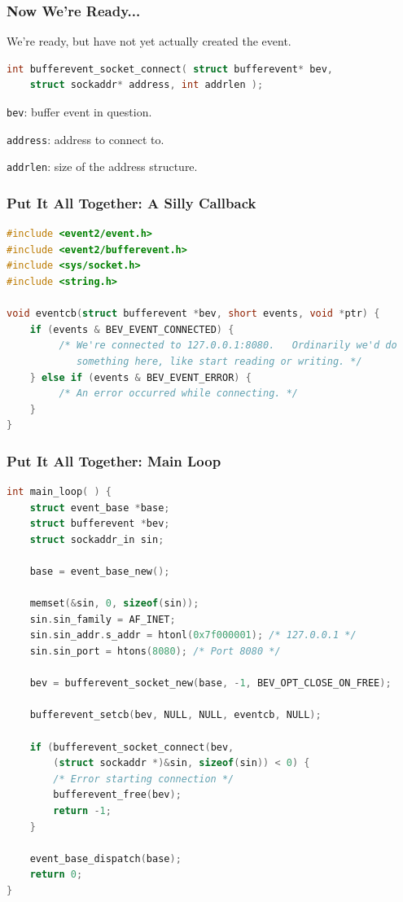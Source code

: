 \begin{frame}[fragile]
	\frametitle{Now We're Ready...}

	We're ready, but have not yet actually created the event.

	\begin{lstlisting}[language=C]
int bufferevent_socket_connect( struct bufferevent* bev, 
    struct sockaddr* address, int addrlen );
\end{lstlisting}

	\texttt{bev}: buffer event in question.

	\texttt{address}: address to connect to.

	\texttt{addrlen}: size of the address structure.

\end{frame}


\begin{frame}[fragile]
	\frametitle{Put It All Together: A Silly Callback}


	\begin{lstlisting}[language=C]
#include <event2/event.h>
#include <event2/bufferevent.h>
#include <sys/socket.h>
#include <string.h>

void eventcb(struct bufferevent *bev, short events, void *ptr) {
    if (events & BEV_EVENT_CONNECTED) {
         /* We're connected to 127.0.0.1:8080.   Ordinarily we'd do
            something here, like start reading or writing. */
    } else if (events & BEV_EVENT_ERROR) {
         /* An error occurred while connecting. */
    }
}
\end{lstlisting}

\end{frame}

\begin{frame}[fragile]
	\frametitle{Put It All Together: Main Loop}

	\begin{lstlisting}[language=C]
int main_loop( ) {
    struct event_base *base;
    struct bufferevent *bev;
    struct sockaddr_in sin;

    base = event_base_new();

    memset(&sin, 0, sizeof(sin));
    sin.sin_family = AF_INET;
    sin.sin_addr.s_addr = htonl(0x7f000001); /* 127.0.0.1 */
    sin.sin_port = htons(8080); /* Port 8080 */

    bev = bufferevent_socket_new(base, -1, BEV_OPT_CLOSE_ON_FREE);

    bufferevent_setcb(bev, NULL, NULL, eventcb, NULL);

    if (bufferevent_socket_connect(bev,
        (struct sockaddr *)&sin, sizeof(sin)) < 0) {
        /* Error starting connection */
        bufferevent_free(bev);
        return -1;
    }

    event_base_dispatch(base);
    return 0;
}\end{lstlisting}

\end{frame}


